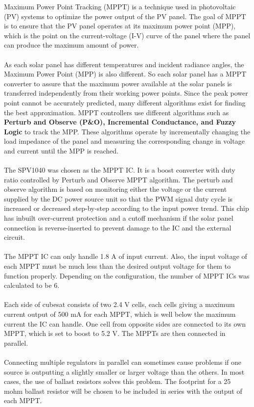 Maximum Power Point Tracking (MPPT) is a technique used in photovoltaic (PV) systems to optimize the power output of the PV panel. The goal of MPPT is to ensure that the PV panel operates at its maximum power point (MPP), which is the point on the current-voltage (I-V) curve of the panel where the panel can produce the maximum amount of power.
\\ \\
As each solar panel has different temperatures and incident radiance angles, the
Maximum Power Point (MPP) is also different. So each solar panel has a MPPT
converter to assure that the maximum power available at the solar panels is
transferred independently from their working power points. Since the peak power
point cannot be accurately predicted, many different algorithms exist for finding
the best approximation. MPPT controllers use different algorithms such as {\bf Perturb and Observe (P\&O), Incremental Conductance, and Fuzzy Logic} to track the MPP. These algorithms operate by incrementally changing the load impedance of the panel and measuring the corresponding change in voltage and current until the MPP is reached.
\\ \\
The SPV1040 was chosen as the MPPT IC. It is a boost converter with duty ratio controlled by Perturb and Observe MPPT algorithm. The perturb and observe algorithm is based on monitoring either the voltage or the current supplied by the DC power source unit so that the PWM signal duty cycle is increased or decreased step-by-step according to the input power trend. This chip has inbuilt over-current protection and a cutoff mechanism if the solar panel connection is reverse-inserted to prevent damage to the IC and the external circuit.
\\ \\
The MPPT IC can only handle 1.8 A of input current. Also, the input voltage of each MPPT must be much less than the desired output voltage for them to function properly. Depending on the configuration, the number of MPPT ICs was calculated to be 6.
\\ \\
Each side of cubesat consists of two 2.4 V cells, each cells giving a maximum current output of 500 mA for each MPPT, which is well below the maximum current the IC can handle. One cell from opposite sides are connected to its own MPPT, which is set to boost to 5.2 V. The MPPTs are then connected in parallel.
\\ \\
Connecting multiple regulators in parallel can sometimes cause problems if one source is outputting a slightly smaller or larger voltage than the others. In most cases, the use of ballast resistors solves this problem. The footprint for a 25 mohm ballast resistor will be chosen to be included in series with the output of each MPPT.\\



